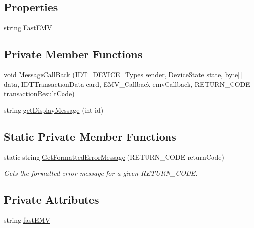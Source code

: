 \subsection*{Properties}
\begin{DoxyCompactItemize}
\item 
string \mbox{\hyperlink{class_form_sim_1_1_i_d_tech_handler_a5d9c224bcb3915493029fc7b58df2b97}{Fast\+E\+MV}}
\end{DoxyCompactItemize}
\subsection*{Private Member Functions}
\begin{DoxyCompactItemize}
\item 
void \mbox{\hyperlink{class_form_sim_1_1_i_d_tech_handler_ac039818aafdf35c179dbf0382d3d0f2f}{Message\+Call\+Back}} (I\+D\+T\+\_\+\+D\+E\+V\+I\+C\+E\+\_\+\+Types sender, Device\+State state, byte\mbox{[}$\,$\mbox{]} data, I\+D\+T\+Transaction\+Data card, E\+M\+V\+\_\+\+Callback emv\+Callback, R\+E\+T\+U\+R\+N\+\_\+\+C\+O\+DE transaction\+Result\+Code)
\item 
string \mbox{\hyperlink{class_form_sim_1_1_i_d_tech_handler_ae1a02c1882241dea211d41c6ce3927da}{get\+Display\+Message}} (int id)
\end{DoxyCompactItemize}
\subsection*{Static Private Member Functions}
\begin{DoxyCompactItemize}
\item 
static string \mbox{\hyperlink{class_form_sim_1_1_i_d_tech_handler_a96e8dc0e78ffc3eed274ec450fd9d272}{Get\+Formatted\+Error\+Message}} (R\+E\+T\+U\+R\+N\+\_\+\+C\+O\+DE return\+Code)
\begin{DoxyCompactList}\small\item\em Gets the formatted error message for a given R\+E\+T\+U\+R\+N\+\_\+\+C\+O\+DE. \end{DoxyCompactList}\end{DoxyCompactItemize}
\subsection*{Private Attributes}
\begin{DoxyCompactItemize}
\item 
string \mbox{\hyperlink{class_form_sim_1_1_i_d_tech_handler_a280030b3a56291c1914f53de368bf65a}{fast\+E\+MV}}
\end{DoxyCompactItemize}



